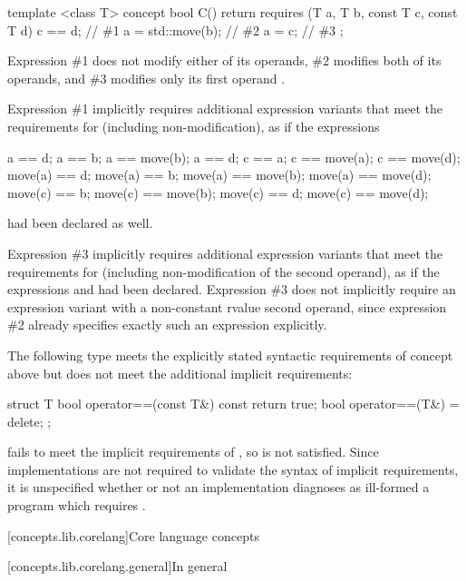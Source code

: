 \begin{addedblock}
\enterexample
\begin{codeblock}
template <class T>
concept bool C() {
  return requires (T a, T b, const T c, const T d) {
    c == d;       // \#1
    a = std::move(b);  // \#2
    a = c;        // \#3
  };
}
\end{codeblock}

Expression \#1 does not modify either of its operands, \#2 modifies both of its
operands, and \#3 modifies only its first operand .

Expression \#1 implicitly requires additional expression variants that meet the
requirements for  (including non-modification), as if the expressions
\begin{codeblock}
a == d;       a == b;             a == move(b);       a == d;
c == a;       c == move(a);       c == move(d);
move(a) == d; move(a) == b;       move(a) == move(b); move(a) == move(d);
move(c) == b; move(c) == move(b); move(c) == d;       move(c) == move(d);
\end{codeblock}
had been declared as well.

Expression \#3 implicitly requires additional expression variants that meet the
requirements for  (including non-modification of the second operand),
as if the expressions  and  had been declared.
Expression \#3 does not implicitly require an expression variant with a
non-constant rvalue second operand, since expression \#2 already specifies exactly
such an expression explicitly.
\exitexample

\enterexample
The following type  meets the explicitly stated syntactic requirements
of concept  above but does not meet the additional implicit requirements:

\begin{codeblock}
struct T {
  bool operator==(const T&) const { return true; }
  bool operator==(T&) = delete;
};
\end{codeblock}

 fails to meet the implicit
requirements of , so  is not satisfied. Since
implementations are not required to validate the syntax of implicit requirements, it
is unspecified whether or not an implementation diagnoses as ill-formed a program
which requires .
\exitexample

[concepts.lib.corelang]{Core language concepts}

[concepts.lib.corelang.general]{In general}


\end{addedblock}
